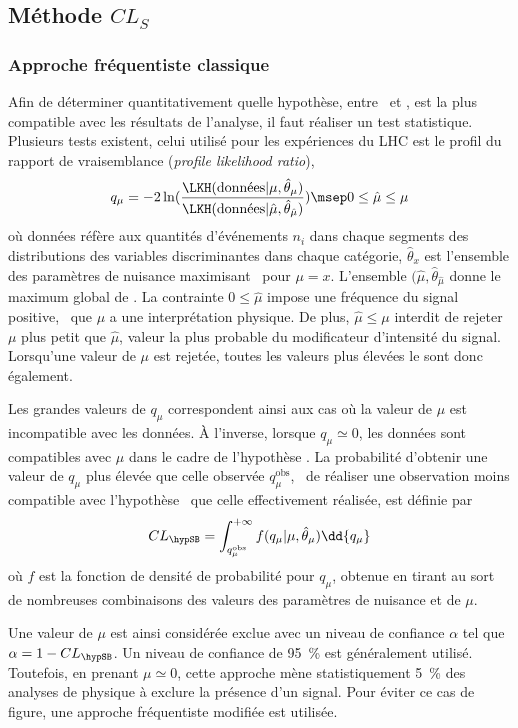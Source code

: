 \subsection{Méthode $CL_S$}\label{chapter-HTT_analysis-section-signal_extraction-CLS}
\subsubsection{Approche fréquentiste classique}
Afin de déterminer quantitativement quelle hypothèse, entre \hypB\ et \hypSB, est la plus compatible avec les résultats de l'analyse, il faut réaliser un test statistique.
Plusieurs tests existent, celui utilisé pour les expériences du LHC est le profil du rapport de vraisemblance (\emph{profile likelihood ratio}),
\begin{equation}
q_{\mu} = -2 \ln(\frac{\LKH(\text{données} |  \mu, \hat{\theta}_{\mu})}{\LKH(\text{données} |  \hat{\mu}, \hat{\theta}_{\hat{\mu}})})
\msep
0 \leq \hat{\mu} \leq \mu
\end{equation}
où
\og données \fg{} réfère aux quantités d'événements $n_i$ dans chaque segments des distributions des variables discriminantes dans chaque catégorie,
$\hat{\theta}_x$ est l'ensemble des paramètres de nuisance maximisant \LKH\ pour $\mu=x$.
L'ensemble $(\hat{\mu},\hat{\theta}_{\hat{\mu}}$ donne le maximum global de \LKH.
La contrainte $0 \leq \hat{\mu}$ impose une fréquence du signal positive, \ie\ que $\mu$ a une interprétation physique.
De plus, $\hat{\mu} \leq \mu$ interdit de rejeter $\mu$ plus petit que $\hat{\mu}$, valeur la plus probable du modificateur d'intensité du signal.
Lorsqu'une valeur de $\mu$ est rejetée, toutes les valeurs plus élevées le sont donc également.
\par
Les grandes valeurs de $q_{\mu}$ correspondent ainsi aux cas où la valeur de $\mu$ est incompatible avec les données.
À l'inverse, lorsque $q_{\mu}\simeq0$, les données sont compatibles avec $\mu$ dans le cadre de l'hypothèse \hypSB.
La probabilité d'obtenir une valeur de $q_{\mu}$ plus élevée que celle observée $q_{\mu}^\text{obs}$,
\ie\ de réaliser une observation moins compatible avec l'hypothèse \hypSB\ que celle effectivement réalisée,
est définie par
\begin{equation}
CL_{\hypSB} = \int_{q_{\mu}^\text{obs}}^{+\infty} f (q_\mu | \mu, \hat{\theta}_\mu) \dd{q_\mu}
\end{equation}
où $f$ est la fonction de densité de probabilité pour $q_{\mu}$, obtenue en tirant au sort de nombreuses combinaisons des valeurs des paramètres de nuisance et de $\mu$.
\par
Une valeur de $\mu$ est ainsi considérée exclue avec un niveau de confiance $\alpha$ tel que
$\alpha = 1 - CL_{\hypSB}$.
Un niveau de confiance de \SI{95}{\%} est généralement utilisé.
Toutefois, en prenant $\mu\simeq0$, cette approche mène statistiquement \SI{5}{\%} des analyses de physique à exclure la présence d'un signal.
Pour éviter ce cas de figure, une approche fréquentiste modifiée est utilisée.
